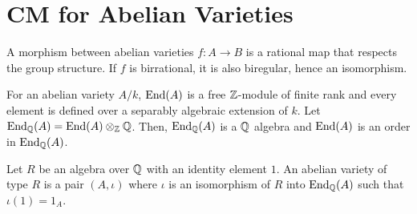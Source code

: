 \documentclass[12pt]{article}
\begin{document}
\newpage
\section{CM for Abelian Varieties}

\begin{definition}
    A morphism between abelian varieties $f: A \to B$ is a rational map that respects the group structure. If $f$ is birrational, it is also biregular, hence an isomorphism.
\end{definition}

\begin{definition}
    For an abelian variety $A/k$, $\operatorname{End}(A)$ is a free $\mathbb Z$-module of finite rank and every element is defined over a separably algebraic extension of $k$. Let $\operatorname{End}_\mathbb Q(A) = \operatorname{End}(A) \otimes_\mathbb Z \mathbb Q$. Then, $\operatorname{End}_\mathbb Q(A)$ is a $\mathbb Q$ algebra and $\operatorname{End}(A)$ is an order in $\operatorname{End}_\mathbb Q(A)$.
\end{definition}





\begin{definition}
    Let $R$ be an algebra over $\mathbb Q$ with an identity element $1$. An abelian variety of type $R$ is a pair $(A, \iota)$ where $\iota$ is an isomorphism of $R$ into $\operatorname{End}_\mathbb Q(A)$ such that $\iota(1) = 1_A$.    
\end{definition}






\end{document}
